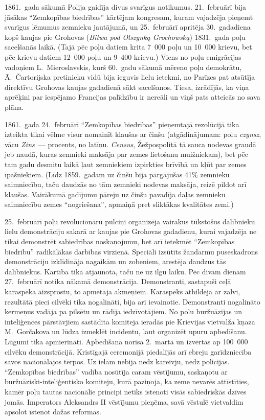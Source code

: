 \documentclass[twoside,a5paper,12pt,fleqn,openany]{extbook}
\newcommand{\pltxti}[1]{\textit{\textpolish{#1}}}
\newcommand{\detxti}[1]{\textit{\textgerman{#1}}}
\newcommand{\latxti}[1]{\textit{\textlatin{#1}}}
\begin{document}
1861.~gada sākumā Polija gaidīja divus svarīgus notikumus. 21.~februārī bija jāsākas ``Zemkopības biedrības'' kārtējam kongresam, kuram vajadzēja pieņemt svarīgus lēmumus zemnieku jautājumā, un 25.~februārī apritēja 30.~gadadiena kopš kaujas pie Grohovas (\pltxti{Bitwa pod Olszynką Grochowską}) 1831.~gada poļu sacelšanās laikā. (Tajā pēc poļu datiem krita 7~000 poļu un 10~000 krievu, bet pēc krievu datiem 12~000 poļu un 9~400 krievu.) Viens no poļu emigrācijas vadoņiem L.~Mieroslavskis, kurš 60.~gadu sākumā mēreno poļu demokrātu, Ā.~Čartorijska pretinieku vidū bija ieguvis lielu ietekmi, no Parīzes pat atsūtīja direktīvu Grohovas kaujas gadadienā sākt sacelšanos. Tiesa, izrādījās, ka viņa aprēķini par iespējamo Francijas palīdzību ir nereāli un viņš pats atteicās no sava plāna.

1861.~gada 24.~februārī ``Zemkopības biedrības'' pieņemtajā rezolūcijā tika izteikta tikai vēlme visur nomainīt klaušas ar činšu (atgādinājumam: poļu \pltxti{czynsz}, vācu \detxti{Zins}~--- procents, no latīņu. \latxti{Census}, Žežpospolitā tā sauca nodevas graudā jeb naudā, kuras zemnieki maksāja par zemes lietošanu muižniekam), bet pēc tam gadu desmitu laikā ļaut zemniekiem izpirkties brīvībā un kļūt par zemes īpašniekiem. (Līdz 1859.~gadam uz činšu bija pārgājušas 41\% zemnieku saimniecību, taču daudzās no tām zemnieki nodevas maksāja, reizē pildot arī klaušas. Vairākumā gadījumu pāreju uz činšu pavadīja daļas zemnieku saimniecību zemes ``nogriešana'', apmaiņā pret sliktākas kvalitātes zemi.)

25.~februārī poļu revolucionāru pulciņi organizēja vairākus tūkstošus dalībnieku lielu demonstrāciju sakarā ar kaujas pie Grohovas gadadienu, kurai vajadzēja ne tikai demonstrēt sabiedrības noskaņojumu, bet arī ietekmēt ``Zemkopības biedrību'' radikālākas darbības virzienā. Speciāli izsūtīts žandarmu puseskadrons demonstrāciju izklīdināja nagaikām un zobeniem, arestēja daudzus tās dalībniekus. Kārtība tika atjaunota, taču ne uz ilgu laiku. Pēc divām dienām 27.~februārī notika nākamā demonstrācija. Demonstranti, sastapuši ceļā karaspēka aizsprostu, to apmētāja akmeņiem. Karaspēks atbildēja ar zalvi, rezultātā pieci cilvēki tika nogalināti, bija arī ievainotie. Demonstranti nogalināto ķermeņus vadāja pa pilsētu un rādīja iedzīvotājiem. No poļu buržuāzijas un inteliģences pārstāvjiem sastādīta komiteja ieradās pie Krievijas vietvalža kņaza M.~Gorčakova un lūdza izmeklēt incidentu, ļaut organizēt upuru apbedīšanu. Lūgumi tika apmierināti. Apbedīšana norisa 2.~martā un izvērtās ap 100~000 cilvēku demonstrācijā. Kristīgajā ceremonijā piedalījās arī ebreju garīdzniecība savos nacionālajos tērpos. Uz ielām nebija nedz kareivju, nedz policijas. ``Zemkopības biedrības'' vadība nosūtīja caram vēstījumu, saskaņotu ar buržuāziski-inteliģentisko komiteju, kurā paziņoja, ka zeme nevarēs attīstīties, kamēr poļu tautas nacionālie principi netiks īstenoti visās sabiedriskās dzīves jomās. Imperators Aleksandrs II vēstījumu pieņēma, savā vēstulē vietvaldim apsolot īstenot dažas reformas.
\end{document}
